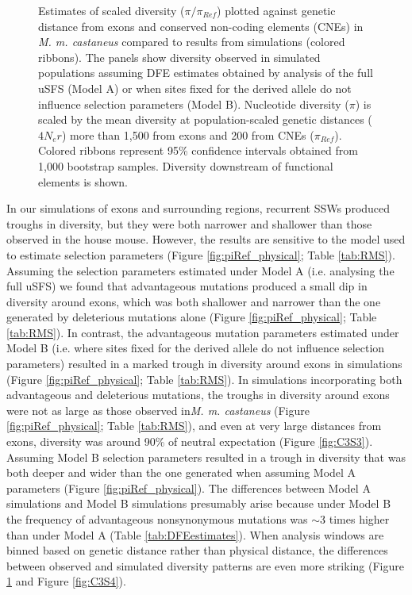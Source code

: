  \begin{figure}[H]
   \centering      
   \noindent{}
 \caption[Reductions in diversity caused by background selection and selective sweeps in simulated data - genetic distance]{Estimates of scaled diversity ($\pi / \pi_{Ref}$) plotted against genetic distance from exons and conserved non-coding elements (CNEs) in \textit{M. m. castaneus} compared to results from simulations (colored ribbons). The panels show diversity observed in simulated populations assuming DFE estimates obtained by analysis of the full uSFS (Model A) or when sites fixed for the derived allele do not influence selection parameters (Model B). Nucleotide diversity ($\pi$) is scaled by the mean diversity at population-scaled genetic distances ($4N_er$) more than 1,500 from exons and 200 from CNEs ($\pi_{Ref}$). Colored ribbons represent 95\% confidence intervals obtained from 1,000 bootstrap samples. Diversity downstream of functional elements is shown.}
 \label{fig:piRef_genetic}
\end{figure}

	In our simulations of exons and surrounding regions, recurrent SSWs produced troughs in diversity, but they were both narrower and shallower than those observed in the house mouse. However, the results are sensitive to the model used to estimate selection parameters (Figure \ref{fig:piRef_physical}; Table \ref{tab:RMS}). Assuming the selection parameters estimated under Model A (i.e. analysing the full uSFS) we found that advantageous mutations produced a small dip in diversity around exons, which was both shallower and narrower than the one generated by deleterious mutations alone (Figure \ref{fig:piRef_physical}; Table \ref{tab:RMS}). In contrast, the advantageous mutation parameters estimated under Model B (i.e. where sites fixed for the derived allele do not influence selection parameters) resulted in a marked trough in diversity around exons in simulations (Figure \ref{fig:piRef_physical}; Table \ref{tab:RMS}). In simulations incorporating both advantageous and deleterious mutations, the troughs in diversity around exons were not as large as those observed in\textit{M. m. castaneus} (Figure \ref{fig:piRef_physical}; Table \ref{tab:RMS}), and even at very large distances from exons, diversity was around 90\% of neutral expectation (Figure \ref{fig:C3S3}). Assuming Model B selection parameters resulted in a trough in diversity that was both deeper and wider than the one generated when assuming Model A parameters (Figure \ref{fig:piRef_physical}). The differences between Model A simulations and Model B simulations presumably arise because under Model B the frequency of advantageous nonsynonymous mutations was $\sim$3 times higher than under Model A (Table \ref{tab:DFEestimates}). When analysis windows are binned based on genetic distance rather than physical distance, the differences between observed and simulated diversity patterns are even more striking (Figure \ref{fig:piRef_genetic} and Figure \ref{fig:C3S4}). 


